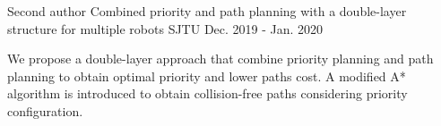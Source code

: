

\begin{cventries}

  \cventry
    {Second author} %
    {Combined priority and path planning with a double-layer structure for multiple robots} %
    {SJTU} %
    {Dec. 2019 - Jan. 2020} %
    {
      \begin{cvitems} %
        \item { We propose a double-layer approach that combine priority planning and path planning to obtain optimal priority and lower paths cost. A modified A* algorithm is introduced to obtain collision-free paths considering priority configuration.
        }
      \end{cvitems}
    }

\end{cventries}
